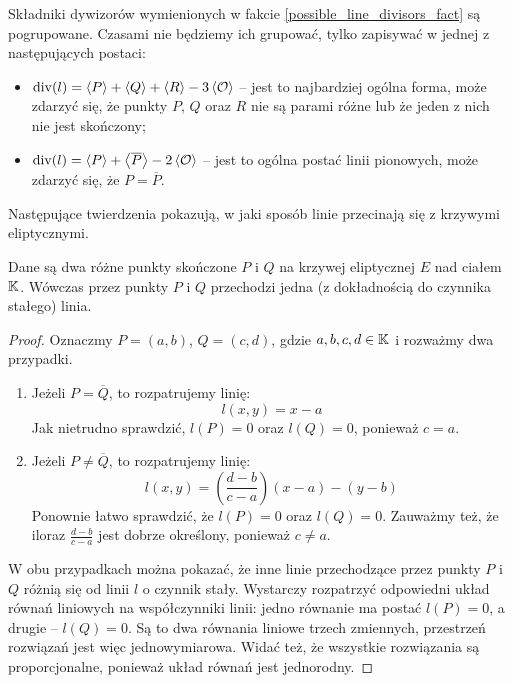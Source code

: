 \begin{remark}\label{possible_line_divisors_remark}
Składniki dywizorów wymienionych w fakcie \ref{possible_line_divisors_fact}
są pogrupowane. Czasami nie będziemy ich grupować,
tylko zapisywać w jednej z następujących postaci:
\begin{itemize}
\item $\operatorname{div}(l) = \left\langle P\right\rangle + \left\langle Q\right\rangle + \left\langle R\right\rangle - 3\left\langle\mathcal{O}\right\rangle$ --
jest to najbardziej ogólna forma,
może zdarzyć się, że punkty $P$, $Q$ oraz $R$ nie są parami różne
lub że jeden z nich nie jest skończony;
\item $\operatorname{div}(l) = \left\langle P\right\rangle + \left\langle\overline{P}\right\rangle - 2\left\langle\mathcal{O}\right\rangle$ --
jest to ogólna postać linii pionowych,
może zdarzyć się, że $P = \overline{P}$.
\end{itemize}
\end{remark}

\noindent
Następujące twierdzenia pokazują,
w jaki sposób linie przecinają się z krzywymi eliptycznymi.

\begin{theorem}\label{line_through_two_points_theorem}
Dane są dwa różne punkty skończone $P$ i $Q$
na krzywej eliptycznej $E$ nad ciałem $\mathbb{K}$.
Wówczas przez punkty $P$ i $Q$
przechodzi jedna (z dokładnością do czynnika stałego) linia.
\end{theorem}

\begin{proof}
Oznaczmy $P = (a, b)$, $Q = (c, d)$,
gdzie $a, b, c, d \in \mathbb{K}$
i rozważmy dwa przypadki.
\begin{enumerate}
\item
Jeżeli $P = \overline{Q}$,
to rozpatrujemy linię:
\begin{equation}
l(x, y) = x - a
\end{equation}
Jak nietrudno sprawdzić, $l(P) = 0$ oraz $l(Q) = 0$,
ponieważ $c = a$.
\item
Jeżeli $P \neq \overline{Q}$,
to rozpatrujemy linię:
\begin{equation}
l(x, y) = \left(\frac{d-b}{c-a}\right)(x - a) - (y - b)
\end{equation}
Ponownie łatwo sprawdzić, że $l(P) = 0$ oraz $l(Q) = 0$.
Zauważmy też,
że iloraz $\frac{d-b}{c-a}$ jest dobrze określony,
ponieważ $c \neq a$.
\end{enumerate}

\noindent
W obu przypadkach można pokazać, że inne linie
przechodzące przez punkty $P$ i $Q$ różnią się od linii $l$ o czynnik stały.
Wystarczy rozpatrzyć odpowiedni układ równań liniowych
na współczynniki linii:
jedno równanie ma postać $l(P) = 0$, a drugie -- $l(Q) = 0$.
Są to dwa równania liniowe trzech zmiennych,
przestrzeń rozwiązań jest więc jednowymiarowa.
Widać też, że wszystkie rozwiązania są proporcjonalne,
ponieważ układ równań jest jednorodny.
\end{proof}

